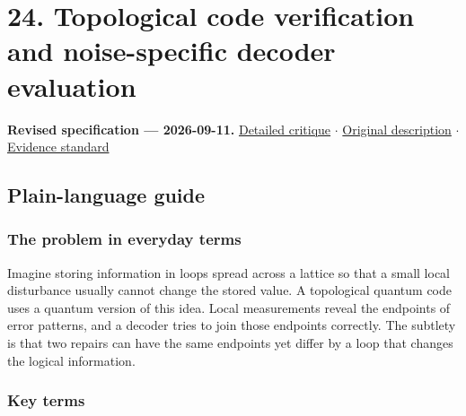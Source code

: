 \documentclass[
  11pt,
]{article}
\begin{document}
\section{24. Topological code verification and noise-specific decoder
evaluation}

\textbf{Revised specification --- 2026-09-11.}
\href{https://github.com/rick-stevens-ai/Pure-Thought/blob/main/reviews/24-Topological-Quantum-Error-Correction.md}{Detailed
critique} \ensuremath{\cdot}
\href{https://github.com/rick-stevens-ai/Pure-Thought/blob/main/archive/original-PRDs/24-Topological-Quantum-Error-Correction.md}{Original
description} \ensuremath{\cdot}
\href{https://github.com/rick-stevens-ai/Pure-Thought/blob/main/reviews/EVIDENCE-STANDARD.md}{Evidence
standard}

\subsection{Plain-language guide}

\subsubsection{The problem in everyday terms}

Imagine storing information in loops spread across a lattice so that a
small local disturbance usually cannot change the stored value. A
topological quantum code uses a quantum version of this idea. Local
measurements reveal the endpoints of error patterns, and a decoder tries
to join those endpoints correctly. The subtlety is that two repairs can
have the same endpoints yet differ by a loop that changes the logical
information.

\subsubsection{Key terms}
\end{document}
